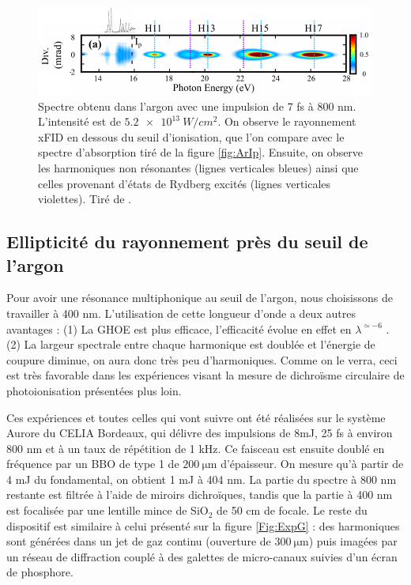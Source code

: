 \begin{figure}[!ht]
\centering
\includegraphics[width=1.1\columnwidth]{Figures/ResonantArgon/xFID.pdf}%
\caption{Spectre obtenu dans l'argon avec une impulsion de 7 fs à 800 nm. L'intensité est de $\SI{5.2e13}{W/cm^2}$. On observe le rayonnement xFID en dessous du seuil d'ionisation, que l'on compare avec le spectre d'absorption tiré de la figure \ref{fig:ArIp}. Ensuite, on observe les harmoniques non résonantes (lignes verticales bleues) ainsi que celles provenant d'états de Rydberg excités (lignes verticales violettes). Tiré de .}
\label{fig:xFID}
\end{figure}



\subsection{Ellipticité du rayonnement près du seuil de l'argon}
\label{sec:resonant_argon_exp}
Pour avoir une résonance multiphonique au seuil de l'argon, nous choisissons de travailler à 400 nm. L'utilisation de cette longueur d'onde a deux autres avantages : (1) La GHOE est plus efficace, l'efficacité évolue en effet en $\lambda^{\simeq-6}$ . (2) La largeur spectrale entre chaque harmonique est doublée et l'énergie de coupure diminue, on aura donc très peu d'harmoniques. Comme on le verra, ceci est très favorable dans les expériences visant la mesure de dichroïsme circulaire de photoionisation présentées plus loin. 

Ces expériences et toutes celles qui vont suivre ont été réalisées sur le système Aurore du CELIA Bordeaux, qui délivre des impulsions de 8mJ, 25 fs à environ 800 nm et à un taux de répétition de 1 kHz. Ce faisceau est ensuite doublé en fréquence par un BBO de type 1 de $\SI{200}{\micro\meter}$ d'épaisseur. On mesure qu'à partir de 4 mJ du fondamental, on obtient 1 mJ à 404 nm. La partie du spectre à 800 nm restante est filtrée à l'aide de miroirs dichroïques, tandis que la partie à 400 nm est focalisée par une lentille mince de Si$\text{O}_\text{2}$ de 50 cm de focale. Le reste du dispositif est similaire à celui présenté sur la figure \ref{Fig:ExpG} : des harmoniques sont générées dans un jet de gaz continu (ouverture de $\SI{300}{\micro\meter}$) puis imagées par un réseau de diffraction couplé à des galettes de micro-canaux suivies d'un écran de phosphore. 

